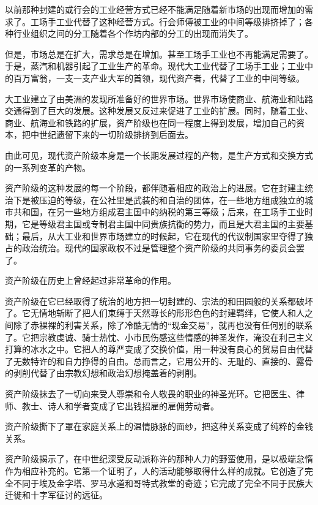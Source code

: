     以前那种封建的或行会的工业经营方式已经不能满足随着新市场的出现而增加的需求了。工场手工业代替了这种经营方式。行会师傅被工业的中间等级排挤掉了；各种行业组织之间的分工随着各个作坊内部的分工的出现而消失了。

    但是，市场总是在扩大，需求总是在增加。甚至工场手工业也不再能满足需要了。于是，蒸汽和机器引起了工业生产的革命。现代大工业代替了工场手工业；工业中的百万富翁，一支一支产业大军的首领，现代资产者，代替了工业的中间等级。

    大工业建立了由美洲的发现所准备好的世界市场。世界市场使商业、航海业和陆路交通得到了巨大的发展。这种发展又反过来促进了工业的扩展。同时，随着工业、商业、航海业和铁路的扩展，资产阶级也在同一程度上得到发展，增加自己的资本，把中世纪遗留下来的一切阶级排挤到后面去。

    由此可见，现代资产阶级本身是一个长期发展过程的产物，是生产方式和交换方式的一系列变革的产物。

    资产阶级的这种发展的每一个阶段，都伴随着相应的政治上的进展。它在封建主统治下是被压迫的等级，在公社里是武装的和自治的团体，在一些地方组成独立的城市共和国，在另一些地方组成君主国中的纳税的第三等级；后来，在工场手工业时期，它是等级君主国或专制君主国中同贵族抗衡的势力，而且是大君主国的主要基础；最后，从大工业和世界市场建立的时候起，它在现代的代议制国家里夺得了独占的政治统治。现代的国家政权不过是管理整个资产阶级的共同事务的委员会罢了。

    资产阶级在历史上曾经起过非常革命的作用。

    资产阶级在它已经取得了统治的地方把一切封建的、宗法的和田园般的关系都破坏了。它无情地斩断了把人们束缚于天然尊长的形形色色的封建羁绊，它使人和人之间除了赤裸裸的利害关系，除了冷酷无情的“现金交易”，就再也没有任何别的联系了。它把宗教虔诚、骑士热忱、小市民伤感这些情感的神圣发作，淹没在利己主义打算的冰水之中。它把人的尊严变成了交换价值，用一种没有良心的贸易自由代替了无数特许的和自力挣得的自由。总而言之，它用公开的、无耻的、直接的、露骨的剥削代替了由宗教幻想和政治幻想掩盖着的剥削。

    资产阶级抹去了一切向来受人尊崇和令人敬畏的职业的神圣光环。它把医生、律师、教士、诗人和学者变成了它出钱招雇的雇佣劳动者。

    资产阶级撕下了罩在家庭关系上的温情脉脉的面纱，把这种关系变成了纯粹的金钱关系。

    资产阶级揭示了，在中世纪深受反动派称许的那种人力的野蛮使用，是以极端怠惰作为相应补充的。它第一个证明了，人的活动能够取得什么样的成就。它创造了完全不同于埃及金字塔、罗马水道和哥特式教堂的奇迹；它完成了完全不同于民族大迁徙和十字军征讨的远征。

